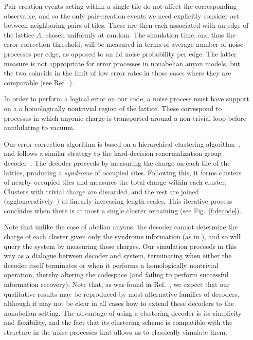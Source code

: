 \documentclass[aps, prl, letterpaper, twocolumn, superscriptaddress, notitlepage, 10pt]{revtex4}
\newcommand{\Fref}[1]{Fig.~\ref{#1}}
\begin{document}
Pair-creation events acting within a single tile do not affect the corresponding observable, and so the only pair-creation events we need explicitly consider act between neighboring pairs of tiles. These are then each associated with an edge of the lattice $\Lambda$, chosen 
uniformly at random. The simulation time, and thus the 
error-correction threshold, will be measured in terms of average number of noise processes 
per edge, as opposed to an iid noise probability per edge. The latter measure is not 
appropriate for error processes in nonabelian anyon models, but the two coincide in the limit 
of low error rates in those cases where they are comparable (see Ref.~\cite{Brell2013}).

In order to perform a logical error on our code, a noise process must have support on a 
a homologically nontrivial region of the lattice.
These correspond to processes in which anyonic charge is transported around a non-trivial loop before 
annihilating to vacuum.

Our error-correction algorithm is
based on a hierarchical clustering algorithm~\cite{Hastie2009, Wootton2015b},
and follows a similar strategy to the hard-decision renormalization group decoder~\cite{Bravyi2011}. 
The decoder proceeds by measuring the charge on 
each tile of the lattice, producing a \emph{syndrome} 
of occupied sites. Following this, it forms clusters of nearby occupied tiles and 
measures the total charge within each cluster.
Clusters with trivial charge are discarded, and
the rest are joined (agglomeratively~\cite{Hastie2009})
at linearly increasing length scales. This iterative process concludes when 
there is at most a single cluster remaining (see \Fref{f:decode}).

Note that unlike the case of abelian anyons, the decoder
cannot determine the charge of each cluster given only the syndrome information (as in \cite{Bravyi2011}),
and so will query the system by measuring these charges.
Our simulation proceeds in this way as a dialogue between decoder
and system, terminating when either the decoder itself terminates or 
when it performs a homologically nontrivial operation, thereby altering the 
codespace (and failing to perform successful information recovery).
Note that, as was found in Ref.~\cite{Brell2013}, we expect that 
our qualitative results may be reproduced by most alternative families 
of decoders, although it may not be clear in all cases how to extend these decoders to the nonabelian setting.
The advantage of using a clustering decoder is 
its simplicity and flexibility, and the fact that its clustering 
scheme is compatible with the structure in the noise 
processes that allows us to classically simulate them.
\end{document}

